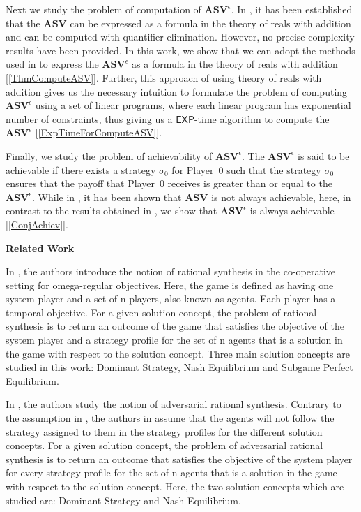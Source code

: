 Next we study the problem of computation of $\mathbf{ASV}^{\epsilon}$. In \cite{FGR20}, it has been established that the $\mathbf{ASV}$ can be expressed as a formula in the theory of reals with addition and can be computed with quantifier elimination. However, no precise complexity results have been provided. In this work, we show that we can adopt the methods used in \cite{FGR20} to express the $\mathbf{ASV}^{\epsilon}$ as a formula in the theory of reals with addition [\cref{ThmComputeASV}]. Further, this approach of using theory of reals with addition gives us the necessary intuition to formulate the problem of computing $\mathbf{ASV}^{\epsilon}$ using a set of linear programs, where each linear program has exponential number of constraints, thus giving us a $\mathsf{EXP}$-time algorithm to compute the $\mathbf{ASV}^{\epsilon}$ [\cref{ExpTimeForComputeASV}]. 

Finally, we study the problem of achievability of $\mathbf{ASV}^{\epsilon}$. The $\mathbf{ASV}^{\epsilon}$ is said to be achievable if there exists a strategy $\sigma_0$ for Player~0 such that the strategy $\sigma_0$ ensures that the payoff that Player~0 receives is greater than or equal to the $\mathbf{ASV}^{\epsilon}$. While in \cite{FGR20}, it has been shown that $\mathbf{ASV}$ is not always achievable, here, in contrast to the results obtained in \cite{FGR20}, we show that $\mathbf{ASV}^{\epsilon}$ is always achievable [\cref{ConjAchiev}].

\textbf{Related Work}

In \cite{FKL10}, the authors introduce the notion of rational synthesis in the co-operative setting for omega-regular objectives. Here, the game is defined as having one system player and a set of n players, also known as agents. Each player has a temporal objective. For a given solution concept, the problem of rational synthesis is to return an outcome of the game that satisfies the objective of the system player and a strategy profile for the set of n agents that is a solution in the game with respect to the solution concept. Three main solution concepts are studied in this work: Dominant Strategy, Nash Equilibrium and Subgame Perfect Equilibrium. 

In \cite{KPV16}, the authors study the notion of adversarial rational synthesis. Contrary to the assumption in \cite{FKL10}, the authors in \cite{KPV16} assume that the agents will not follow the strategy assigned to them in the strategy profiles for the different solution concepts. For a given solution concept, the problem of adversarial rational synthesis is to return an outcome that satisfies the objective of the system player for every strategy profile for the set of n agents that is a solution in the game with respect to the solution concept. Here, the two solution concepts which are studied are: Dominant Strategy and Nash Equilibrium.

